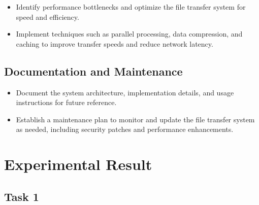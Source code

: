 \documentclass[11pt]{article}
\begin{document}
\begin{itemize}
  \item Identify performance bottlenecks and optimize the file transfer system for speed and efficiency.
  \item Implement techniques such as parallel processing, data compression, and caching to improve transfer speeds and reduce network latency.
\end{itemize}

\subsection{Documentation and Maintenance}

\begin{itemize}
  \item Document the system architecture, implementation details, and usage instructions for future reference.
  \item Establish a maintenance plan to monitor and update the file transfer system as needed, including security patches and performance enhancements.
\end{itemize}





\section{Experimental Result}

\subsection{Task 1}
\end{document}
